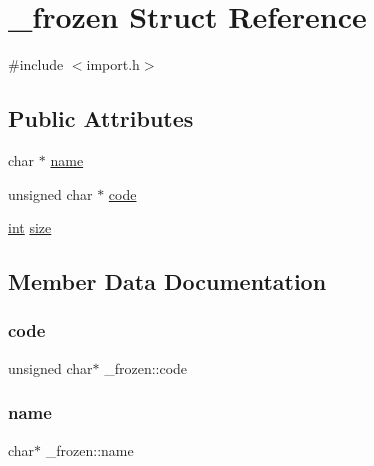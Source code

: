 \hypertarget{struct__frozen}{}\section{\+\_\+frozen Struct Reference}
\label{struct__frozen}


{\ttfamily \#include $<$import.\+h$>$}

\subsection*{Public Attributes}
\begin{DoxyCompactItemize}
\item 
char $\ast$ \mbox{\hyperlink{struct__frozen_adce8e0485f95a83bbb425c74243867a5}{name}}
\item 
unsigned char $\ast$ \mbox{\hyperlink{struct__frozen_ab652695959171f18c9761cc779653723}{code}}
\item 
\mbox{\hyperlink{warnings_8h_a74f207b5aa4ba51c3a2ad59b219a423b}{int}} \mbox{\hyperlink{struct__frozen_a133542436cc02e1856dd2108c0dc1efc}{size}}
\end{DoxyCompactItemize}


\subsection{Member Data Documentation}
\mbox{\label{struct__frozen_ab652695959171f18c9761cc779653723}} 
\subsubsection{\texorpdfstring{code}{code}}
{\footnotesize\ttfamily unsigned char$\ast$ \+\_\+frozen\+::code}

\mbox{\label{struct__frozen_adce8e0485f95a83bbb425c74243867a5}} 
\subsubsection{\texorpdfstring{name}{name}}
{\footnotesize\ttfamily char$\ast$ \+\_\+frozen\+::name}

\mbox{\label{struct__frozen_a133542436cc02e1856dd2108c0dc1efc}} 
